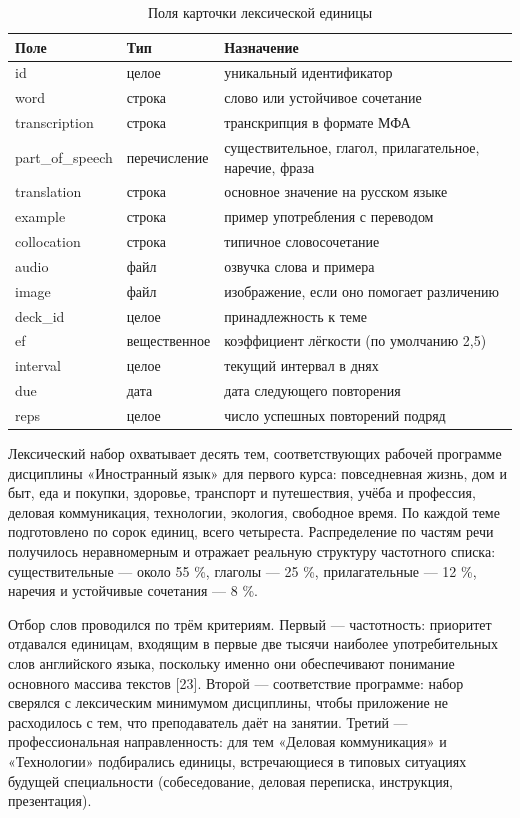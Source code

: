 \documentclass[11pt,a4paper,openany]{report}
\begin{document}
\begin{table}[htbp]
\centering
\small
\caption{Поля карточки лексической единицы}
\begin{tabular}{|p{3.2cm}|p{3.0cm}|p{9.6cm}|}
\hline
Поле & Тип & Назначение \\
\hline
id & целое & уникальный идентификатор \\
\hline
word & строка & слово или устойчивое сочетание \\
\hline
transcription & строка & транскрипция в формате МФА \\
\hline
part\_of\_speech & перечисление & существительное, глагол, прилагательное, наречие, фраза \\
\hline
translation & строка & основное значение на русском языке \\
\hline
example & строка & пример употребления с переводом \\
\hline
collocation & строка & типичное словосочетание \\
\hline
audio & файл & озвучка слова и примера \\
\hline
image & файл & изображение, если оно помогает различению \\
\hline
deck\_id & целое & принадлежность к теме \\
\hline
ef & вещественное & коэффициент лёгкости (по умолчанию 2,5) \\
\hline
interval & целое & текущий интервал в днях \\
\hline
due & дата & дата следующего повторения \\
\hline
reps & целое & число успешных повторений подряд \\
\hline
\end{tabular}
\end{table}

Лексический набор охватывает десять тем, соответствующих рабочей программе дисциплины «Иностранный язык» для первого курса: повседневная жизнь, дом и быт, еда и покупки, здоровье, транспорт и путешествия, учёба и профессия, деловая коммуникация, технологии, экология, свободное время. По каждой теме подготовлено по сорок единиц, всего четыреста. Распределение по частям речи получилось неравномерным и отражает реальную структуру частотного списка: существительные — около 55 \%, глаголы — 25 \%, прилагательные — 12 \%, наречия и устойчивые сочетания — 8 \%.

Отбор слов проводился по трём критериям. Первый — частотность: приоритет отдавался единицам, входящим в первые две тысячи наиболее употребительных слов английского языка, поскольку именно они обеспечивают понимание основного массива текстов [23]. Второй — соответствие программе: набор сверялся с лексическим минимумом дисциплины, чтобы приложение не расходилось с тем, что преподаватель даёт на занятии. Третий — профессиональная направленность: для тем «Деловая коммуникация» и «Технологии» подбирались единицы, встречающиеся в типовых ситуациях будущей специальности (собеседование, деловая переписка, инструкция, презентация).
\end{document}
